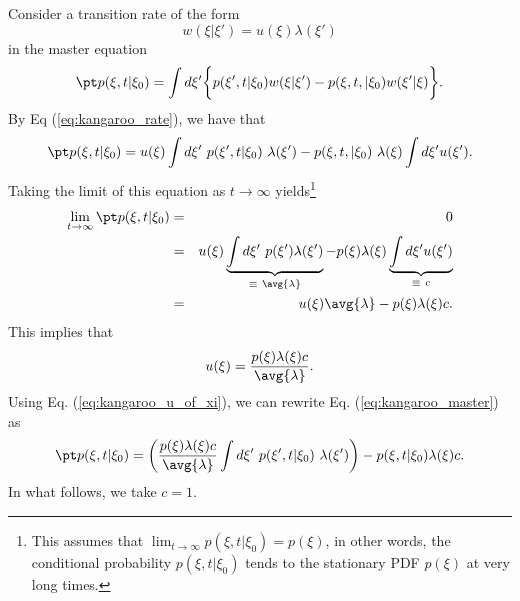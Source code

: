 Consider a transition rate of the form 
\begin{equation}
w(\xi|\xi') = u(\xi) \lambda(\xi') \label{eq:kangaroo_rate}
\end{equation} 
in the master equation
\begin{equation}
\pt p(\xi, t | \xi_0) = \int d\xi' \bigg\{ p(\xi', t | \xi_0) w(\xi|\xi') -  p(\xi, t, |\xi_0) w(\xi'|\xi) \bigg\}. \nonumber
\end{equation}
By Eq (\ref{eq:kangaroo_rate}), we have that
\begin{equation}
\pt p(\xi, t | \xi_0) = u(\xi) \int d \xi'~p(\xi', t | \xi_0) ~\lambda(\xi') - p(\xi, t, |\xi_0)~\lambda(\xi) \int d \xi' u(\xi'). \label{eq:kangaroo_master}
\end{equation}
Taking the limit of this equation as $t\rightarrow \infty$ yields\footnote{This assumes that $\lim_{t\rightarrow \infty} p(\xi, t| \xi_0) = p(\xi)$, in other words, the conditional probability $p(\xi, t | \xi_0)$ tends to the stationary PDF $p(\xi)$ at very long times.}
\begin{eqnarray}
\lim_{t\rightarrow \infty} \pt p(\xi, t| \xi_0) &=& 0 \nonumber \\
&=& u(\xi) \underbrace{\int d \xi'~p(\xi') \lambda(\xi')}_{\equiv~\avg{\lambda}} -  p(\xi) \lambda(\xi) \underbrace{\int d \xi' u(\xi')}_{\equiv ~c} \nonumber \\
&=&  u(\xi)\avg{\lambda} -  p(\xi) \lambda(\xi) c. \nonumber
\end{eqnarray}
This implies that
\begin{equation}
u(\xi) = \frac{p(\xi) \lambda(\xi)c}{\avg{\lambda}}. \nonumber \label{eq:kangaroo_u_of_xi}
\end{equation}
Using Eq. (\ref{eq:kangaroo_u_of_xi}), we can rewrite Eq. (\ref{eq:kangaroo_master}) as
\begin{equation}
\pt p(\xi, t | \xi_0) = \bigg( \frac{p(\xi)\lambda(\xi)c}{\avg{\lambda}} \int d \xi'~p(\xi', t | \xi_0)~\lambda(\xi') \bigg) - p(\xi, t | \xi_0) \lambda(\xi) c. \label{eq:kangaroo_simplified_master}
\end{equation}
In what follows, we take $c=1$.

